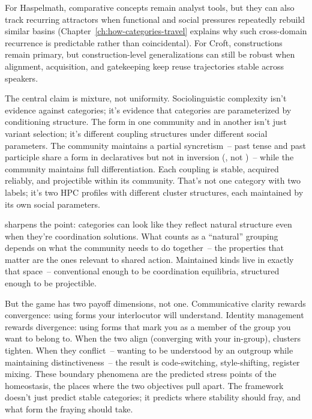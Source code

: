 For Haspelmath, comparative concepts remain analyst tools, but they can also track recurring attractors when functional and social pressures repeatedly rebuild similar basins (Chapter~\ref{ch:how-categories-travel} explains why such cross-domain recurrence is predictable rather than coincidental). For Croft, constructions remain primary, but construction-level generalizations can still be robust when alignment, acquisition, and gatekeeping keep reuse trajectories stable across speakers.

The central claim is mixture, not uniformity. Sociolinguistic complexity isn't evidence against categories; it's evidence that categories are parameterized by conditioning structure. The form  in one community and  in another isn't just variant selection; it's different coupling structures under different social parameters. The  community maintains a partial syncretism~-- past tense and past participle share a form in declaratives but not in inversion (, not )~-- while the  community maintains full differentiation. Each coupling is stable, acquired reliably, and projectible within its community. That's not one category with two labels; it's two HPC profiles with different cluster structures, each maintained by its own social parameters.

\textcite{oconnor2019games} sharpens the point: categories can look like they reflect natural structure even when they're coordination solutions. What counts as a \enquote{natural} grouping depends on what the community needs to do together~-- the properties that matter are the ones relevant to shared action. Maintained kinds live in exactly that space~-- conventional enough to be coordination equilibria, structured enough to be projectible.

But the game has two payoff dimensions, not one. Communicative clarity rewards convergence: using forms your interlocutor will understand. Identity management rewards divergence: using forms that mark you as a member of the group you want to belong to. When the two align (converging with your in-group), clusters tighten. When they conflict~-- wanting to be understood by an outgroup while maintaining distinctiveness~-- the result is code-switching, style-shifting, register mixing. These boundary phenomena are the predicted stress points of the homeostasis, the places where the two objectives pull apart. The framework doesn't just predict stable categories; it predicts where stability should fray, and what form the fraying should take.

